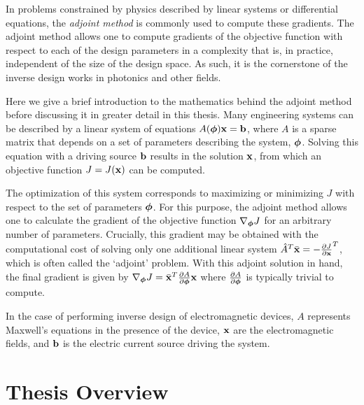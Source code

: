 In problems constrained by physics described by linear systems or differential equations, the \textit{adjoint method} is commonly used to compute these gradients.
The adjoint method allows one to compute gradients of the objective function with respect to each of the design parameters in a complexity that is, in practice, independent of the size of the design space.
As such, it is the cornerstone of the inverse design works in photonics and other fields.

Here we give a brief introduction to the mathematics behind the adjoint method before discussing it in greater detail in this thesis.
Many engineering systems can be described by a linear system of equations $A(\bm{\phi}) \mathbf{x} = \mathbf{b}$, where $A$ is a sparse matrix that depends on a set of parameters describing the system, $\bm{\phi}$.
Solving this equation with a driving source $\mathbf{b}$ results in the solution $\mathbf{x}$, from which an objective function $J=J(\mathbf{x})$ can be computed.

The optimization of this system corresponds to maximizing or minimizing $J$ with respect to the set of parameters $\bm{\phi}$.
For this purpose, the adjoint method allows one to calculate the gradient of the objective function $\nabla_{\bm{\phi}} J$ for an arbitrary number of parameters.
Crucially, this gradient may be obtained with the computational cost of solving only one additional linear system $\hat{A}^T \bar{\mathbf{x}} = -\frac{\partial J}{\partial \mathbf{x}}^T$, which is often called the `adjoint' problem.
With this adjoint solution in hand, the final gradient is given by $\nabla_{\bm{\phi}} J = \bar{\mathbf{x}}^T \frac{\partial A}{\partial \bm{\phi}} \mathbf{x}$ where $\frac{\partial A}{\partial \bm{\phi}}$ is typically trivial to compute.

In the case of performing inverse design of electromagnetic devices, $A$ represents Maxwell's equations in the presence of the device, $\mathbf{x}$ are the electromagnetic fields, and $\mathbf{b}$ is the electric current source driving the system.

\section{Thesis Overview}

